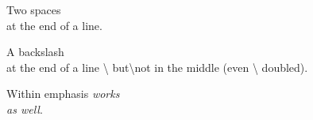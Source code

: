 Two spaces\\
at the end of a line.

A backslash\\
at the end of a line \textbackslash{} but\textbackslash{}not in the middle (even \textbackslash{} doubled).

Within emphasis \emph{works\\
as well}.

